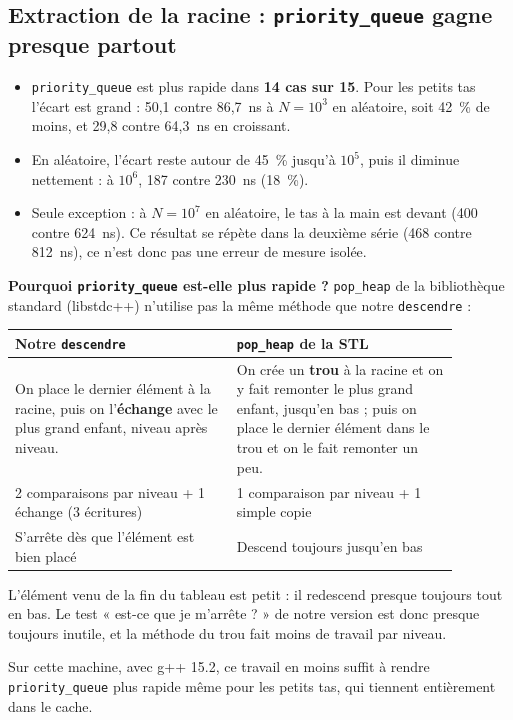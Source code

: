 \documentclass[12pt,a4paper]{report}
\begin{document}
\subsection{Extraction de la racine : \texttt{priority\_queue} gagne presque partout}
\begin{itemize}
  \item \texttt{priority\_queue} est plus rapide dans \textbf{14 cas sur 15}. Pour les petits tas l'écart est grand : 50,1 contre 86,7~ns à $N=10^3$ en aléatoire, soit 42~\% de moins, et 29,8 contre 64,3~ns en croissant.
  \item En aléatoire, l'écart reste autour de 45~\% jusqu'à $10^5$, puis il diminue nettement : à $10^6$, 187 contre 230~ns (18~\%).
  \item Seule exception : à $N=10^7$ en aléatoire, le tas à la main est devant (400 contre 624~ns). Ce résultat se répète dans la deuxième série (468 contre 812~ns), ce n'est donc pas une erreur de mesure isolée.
\end{itemize}

\textbf{Pourquoi \texttt{priority\_queue} est-elle plus rapide ?} \texttt{pop\_heap} de la bibliothèque standard (libstdc++) n'utilise pas la même méthode que notre \texttt{descendre} :
\begin{center}
\begin{tabular}{p{0.44\linewidth}p{0.44\linewidth}}
  \toprule
  Notre \texttt{descendre} & \texttt{pop\_heap} de la STL \\
  \midrule
  On place le dernier élément à la racine, puis on l'\textbf{échange} avec le plus grand enfant, niveau après niveau. &
  On crée un \textbf{trou} à la racine et on y fait remonter le plus grand enfant, jusqu'en bas ; puis on place le dernier élément dans le trou et on le fait remonter un peu. \\
  2 comparaisons par niveau + 1 échange (3 écritures) & 1 comparaison par niveau + 1 simple copie \\
  S'arrête dès que l'élément est bien placé & Descend toujours jusqu'en bas \\
  \bottomrule
\end{tabular}
\end{center}
L'élément venu de la fin du tableau est petit : il redescend presque toujours tout en bas. Le test « est-ce que je m'arrête ? » de notre version est donc presque toujours inutile, et la méthode du trou fait moins de travail par niveau.

Sur cette machine, avec g++ 15.2, ce travail en moins suffit à rendre \texttt{priority\_queue} plus rapide même pour les petits tas, qui tiennent entièrement dans le cache.
\end{document}

